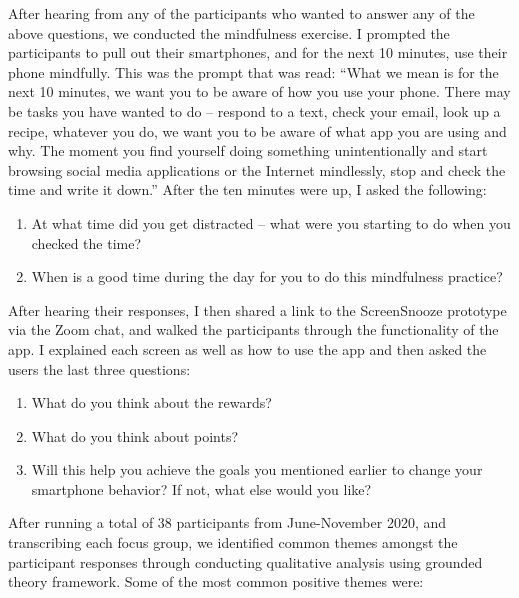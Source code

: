 \documentclass[12pt, title page, manuscript, nonacm]{acmart}
\begin{document}
After hearing from any of the participants who wanted to answer any of the above questions, we conducted the mindfulness exercise. I prompted the participants to pull out their smartphones, and for the next 10 minutes, use their phone mindfully. This was the prompt that was read: “What we mean is for the next 10 minutes, we want you to be aware of how you use your phone. There may be tasks you have wanted to do -- respond to a text, check your email, look up a recipe, whatever you do, we want you to be aware of what app you are using and why. The moment you find yourself doing something unintentionally and start browsing social media applications or the Internet mindlessly, stop and check the time and write it down.”
After the ten minutes were up, I asked the following:
\begin{enumerate}
    \item At what time did you get distracted – what were you starting to do when you checked the time?
    \item When is a good time during the day for you to do this mindfulness practice?
\end{enumerate}
After hearing their responses, I then shared a link to the ScreenSnooze prototype via the Zoom chat, and walked the participants through the functionality of the app. I explained each screen as well as how to use the app and then asked the users the last three questions: 
\begin{enumerate}
    \item What do you think about the rewards?
    \item What do you think about points?
    \item Will this help you achieve the goals you mentioned earlier to change your smartphone behavior? If not, what else would you like?
\end{enumerate}
After running a total of 38 participants from June-November 2020, and transcribing each focus group, we identified common themes amongst the participant responses through conducting qualitative analysis using grounded theory framework. Some of the most common positive themes were:
\end{document}
